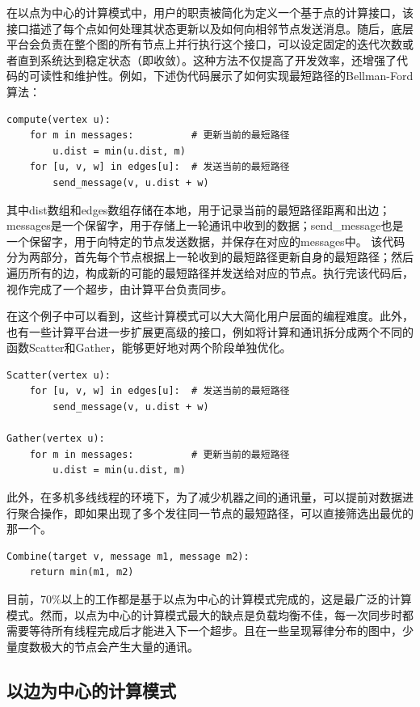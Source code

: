 在以点为中心的计算模式中，用户的职责被简化为定义一个基于点的计算接口，该接口描述了每个点如何处理其状态更新以及如何向相邻节点发送消息。随后，底层平台会负责在整个图的所有节点上并行执行这个接口，可以设定固定的迭代次数或者直到系统达到稳定状态（即收敛）。这种方法不仅提高了开发效率，还增强了代码的可读性和维护性。例如，下述伪代码展示了如何实现最短路径的Bellman-Ford算法：
\begin{lstlisting}
compute(vertex u):
    for m in messages:          # 更新当前的最短路径
        u.dist = min(u.dist, m)
    for [u, v, w] in edges[u]:  # 发送当前的最短路径
        send_message(v, u.dist + w)
\end{lstlisting}
其中dist数组和edges数组存储在本地，用于记录当前的最短路径距离和出边；messages是一个保留字，用于存储上一轮通讯中收到的数据；send\_message也是一个保留字，用于向特定的节点发送数据，并保存在对应的messages中。
该代码分为两部分，首先每个节点根据上一轮收到的最短路径更新自身的最短路径；然后遍历所有的边，构成新的可能的最短路径并发送给对应的节点。执行完该代码后，视作完成了一个超步，由计算平台负责同步。

在这个例子中可以看到，这些计算模式可以大大简化用户层面的编程难度。此外，也有一些计算平台进一步扩展更高级的接口，例如将计算和通讯拆分成两个不同的函数Scatter和Gather，能够更好地对两个阶段单独优化。
\begin{lstlisting}
Scatter(vertex u):
    for [u, v, w] in edges[u]:  # 发送当前的最短路径
        send_message(v, u.dist + w)

Gather(vertex u):
    for m in messages:          # 更新当前的最短路径
        u.dist = min(u.dist, m)
\end{lstlisting}

此外，在多机多线线程的环境下，为了减少机器之间的通讯量，可以提前对数据进行聚合操作，即如果出现了多个发往同一节点的最短路径，可以直接筛选出最优的那一个。
\begin{lstlisting}
Combine(target v, message m1, message m2):
    return min(m1, m2)
\end{lstlisting}

目前，70\%以上的工作都是基于以点为中心的计算模式完成的，这是最广泛的计算模式。然而，以点为中心的计算模式最大的缺点是负载均衡不佳，每一次同步时都需要等待所有线程完成后才能进入下一个超步。且在一些呈现幂律分布的图中，少量度数极大的节点会产生大量的通讯。

\subsection{以边为中心的计算模式}

